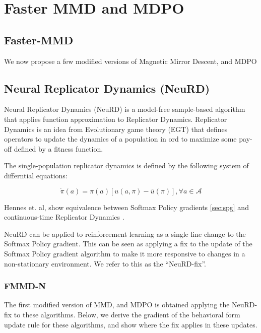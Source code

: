 \chapter{Faster MMD and MDPO}

\section{Faster-MMD}

We now propose a few modified versions of Magnetic Mirror Descent, and MDPO

\section{Neural Replicator Dynamics (NeuRD)} Neural Replicator Dynamics (NeuRD)
\cite{hennesNeural2020} is a model-free sample-based algorithm that applies function approximation
to Replicator Dynamics.
Replicator Dynamics is an idea from Evolutionary game theory (EGT) that defines operators to update
the dynamics of a population in ord to maximize some pay-off defined by a fitness function.

The single-population replicator dynamics is defined by the following system of differntial
equations:

\begin{equation}
	\label{eqn:rd} \dot{\pi}(a) = \pi(a)[u(a, \pi) -
		\bar{u}(\pi)], \forall a \in \mathcal{A}
\end{equation}

Hennes et.
al, \cite{hennesNeural2020} show equivalence between Softmax Policy gradients
\ref{sec:spg} and continuous-time Replicator Dynamics \cite[THEOREM 1, on p5]{hennesNeural2020}\label{thm:spgrd}.

NeuRD can be applied to reinforcement learning as a single line change to the Softmax Policy
gradient.
This can be seen as applying a fix to the update of the Softmax Policy gradient algorithm to make
it more responsive to changes in a non-stationary environment.
We refer to this as the ``NeuRD-fix''.

\subsection{FMMD-N}

The first modified version of MMD, and MDPO is obtained applying the NeuRD-fix to these algorithms.
Below, we derive the gradient of the behavioral form update rule for these algorithms, and show
where the fix applies in these updates.

